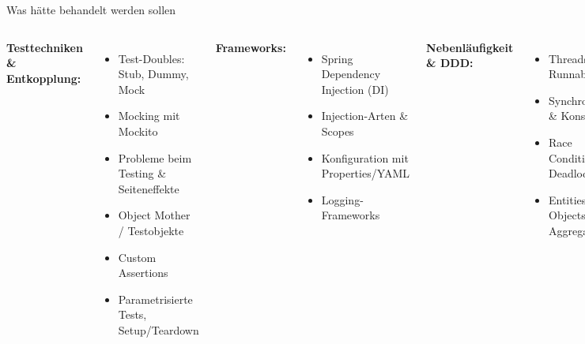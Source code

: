 \begin{frame}{Was hätte behandelt werden sollen}
  \begin{columns}[T]
    \textbf{Testtechniken \& Entkopplung:}
    \begin{itemize}
      \item Test-Doubles: Stub, Dummy, Mock
      \item Mocking mit Mockito
      \item Probleme beim Testing \& Seiteneffekte
      \item Object Mother / Testobjekte
      \item Custom Assertions
      \item Parametrisierte Tests, Setup/Teardown
    \end{itemize}

    \textbf{Frameworks:}
    \begin{itemize}
      \item Spring Dependency Injection (DI)
      \item Injection-Arten \& Scopes
      \item Konfiguration mit Properties/YAML
      \item Logging-Frameworks
    \end{itemize}

    \textbf{Nebenläufigkeit \& DDD:}
    \begin{itemize}
      \item Threads \& Runnable
      \item Synchronisation \& Konsistenz
      \item Race Conditions \& Deadlocks
      \item Entities, Value Objects, Aggregates
    \end{itemize}

    \textbf{Git im Detail:}
    \begin{itemize}
      \item Commits \& SHA-Hashes
      \item Merge vs. Rebase
      \item Branching-Strategien
      \item Git-Interna
      \item Dezentralität von Git
    \end{itemize}
  \end{columns}
\end{frame}
